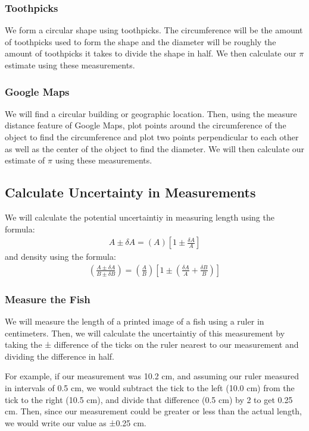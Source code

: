 \documentclass{article}
\begin{document}
\subsubsection{Toothpicks}
We form a circular shape using toothpicks. The circumference will be the amount 
of toothpicks used to form the shape and the diameter will be roughly the amount 
of toothpicks it takes to divide the shape in half. We then calculate our $\pi$ 
estimate using these measurements.

\subsubsection{Google Maps}
We will find a circular building or geographic location. Then, using the measure
distance feature of Google Maps, plot points around the circumference of the object to 
find the circumference and plot two points perpendicular to each other as well as the center of 
the object to find the diameter. We will then calculate our estimate of $\pi$ using these 
measurements.

\subsection{Calculate Uncertainty in Measurements}
We will calculate the potential uncertaintiy in measuring length using the formula:
\begin{align}
    A \pm \delta A = (A)\left[1\pm\frac{\delta A}{A}\right]
\end{align}
and density using the formula:
\begin{align}
    \left(\frac{A\pm\delta A}{B\pm\delta B}\right) = \left(\frac{A}{B}\right)\left[1\pm\left(\frac{\delta A}{A}+\frac{\delta B}{B}\right)\right]\label{eq:2}
\end{align}

\subsubsection{Measure the Fish}
We will measure the length of a printed image of a fish using a ruler in centimeters. Then, we will calculate
the uncertaintiy of this measurement by taking the ± difference of the ticks on the ruler nearest to our
measurement and dividing the difference in half.

For example, if our measurement was 10.2 cm, and assuming our ruler measured in intervals of 0.5 cm, we
would subtract the tick to the left (10.0 cm) from the tick to the right (10.5 cm), and divide that difference
(0.5 cm) by 2 to get 0.25 cm. Then, since our measurement could be greater or less than the actual length,
we would write our value as ±0.25 cm.
\end{document}
